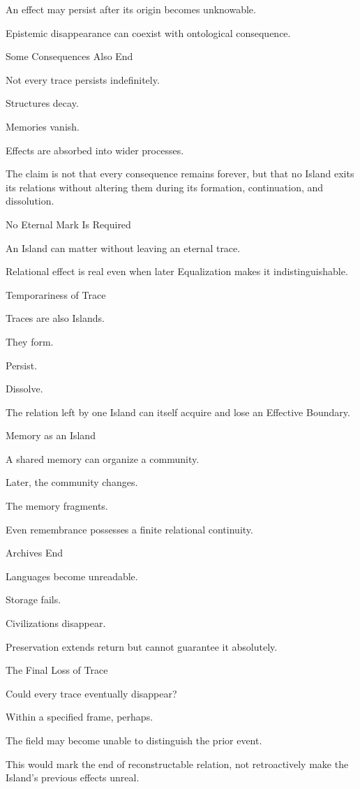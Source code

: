 An effect may persist after its origin becomes unknowable.

Epistemic disappearance can coexist with ontological consequence.

Some Consequences Also End

Not every trace persists indefinitely.

Structures decay.

Memories vanish.

Effects are absorbed into wider processes.

The claim is not that every consequence remains forever, but that no Island exits its relations without altering them during its formation, continuation, and dissolution.

No Eternal Mark Is Required

An Island can matter without leaving an eternal trace.

Relational effect is real even when later Equalization makes it indistinguishable.

Temporariness of Trace

Traces are also Islands.

They form.

Persist.

Dissolve.

The relation left by one Island can itself acquire and lose an Effective Boundary.

Memory as an Island

A shared memory can organize a community.

Later, the community changes.

The memory fragments.

Even remembrance possesses a finite relational continuity.

Archives End

Languages become unreadable.

Storage fails.

Civilizations disappear.

Preservation extends return but cannot guarantee it absolutely.

The Final Loss of Trace

Could every trace eventually disappear?

Within a specified frame, perhaps.

The field may become unable to distinguish the prior event.

This would mark the end of reconstructable relation, not retroactively make the Island’s previous effects unreal.

